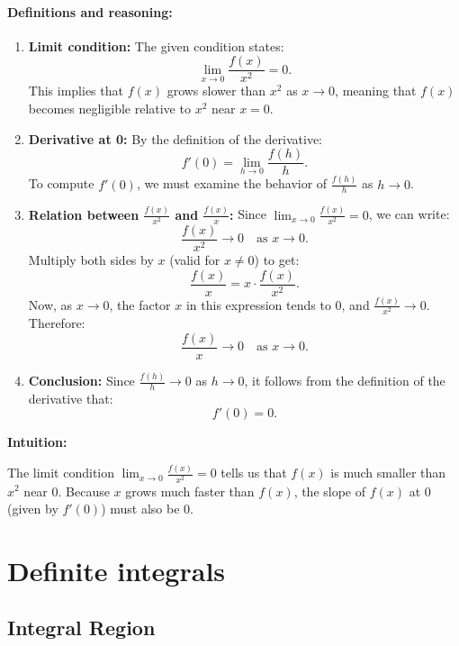 \documentclass[a4paper,12pt]{book}
\begin{document}
\subsubsection{Definitions and reasoning:}
\begin{enumerate}
\item 
\textbf{Limit condition:}\newline
The given condition states:
\[
\lim_{x \to 0} \frac{f(x)}{x^2} = 0.
\]
This implies that \( f(x) \) grows slower than \( x^2 \) as \( x \to 0 \), meaning that \( f(x) \) becomes negligible relative to \( x^2 \) near \( x = 0 \).

\item 
\textbf{Derivative at 0:}\newline
By the definition of the derivative:
\[
f'(0) = \lim_{h \to 0} \frac{f(h)}{h}.
\]
To compute \( f'(0) \), we must examine the behavior of \( \frac{f(h)}{h} \) as \( h \to 0 \).

\item 
\textbf{Relation between \(\frac{f(x)}{x^2}\) and \(\frac{f(x)}{x}\):}\newline
Since \(\lim_{x \to 0} \frac{f(x)}{x^2} = 0\), we can write:
\[
\frac{f(x)}{x^2} \to 0 \quad \text{as } x \to 0.
\]
Multiply both sides by \( x \) (valid for \( x \neq 0 \)) to get:
\[
\frac{f(x)}{x} = x \cdot \frac{f(x)}{x^2}.
\]
Now, as \( x \to 0 \), the factor \( x \) in this expression tends to 0, and \( \frac{f(x)}{x^2} \to 0 \). Therefore:
\[
\frac{f(x)}{x} \to 0 \quad \text{as } x \to 0.
\]

\item 
\textbf{Conclusion:}\newline
Since \( \frac{f(h)}{h} \to 0 \) as \( h \to 0 \), it follows from the definition of the derivative that:
\[
f'(0) = 0.
\]

\end{enumerate}

\textbf{Intuition:}

The limit condition \(\lim_{x \to 0} \frac{f(x)}{x^2} = 0\) tells us that \( f(x) \) is much smaller than \( x^2 \) near 0. Because \( x \) grows much faster than \( f(x) \), the slope of \( f(x) \) at 0 (given by \( f'(0) \)) must also be 0.

\chapter{Definite integrals}

\section{Integral Region}
\end{document}
